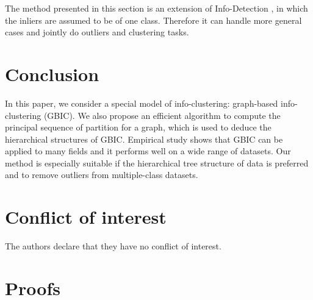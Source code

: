 The method presented in this section is an extension of Info-Detection \citep{zhao2019info}, in which the inliers are assumed to be of one class. Therefore it can handle more general cases and
jointly do outliers and clustering tasks.

\section{Conclusion}\label{sec:conc}
In this paper, we consider a special model of info-clustering: graph-based info-clustering (GBIC). We also propose an efficient algorithm to compute the principal sequence of partition for a graph, which is used to deduce the hierarchical structures of GBIC. Empirical study shows that GBIC can be applied to many fields and it performs well on a wide range of datasets. Our method is especially suitable if the hierarchical tree structure of data is preferred and to remove outliers from multiple-class datasets.


%
\section*{Conflict of interest}
%
The authors declare that they have no conflict of interest.



%
%
\appendix
\section{Proofs}
